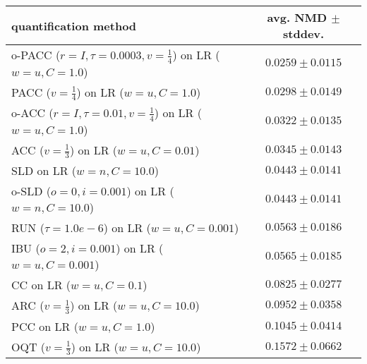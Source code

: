 \begin{tabular}{lc}
  \toprule
  quantification method & avg. NMD $\pm$ stddev. \\
  \midrule
  o-PACC ($r=I, \tau=0.0003, v=\frac{1}{4}$) on LR ($w=u, C=1.0$) & $\mathbf{0.0259 \pm 0.0115}$ \\
  PACC ($v=\frac{1}{4}$) on LR ($w=u, C=1.0$) & $0.0298 \pm 0.0149$ \\
  o-ACC ($r=I, \tau=0.01, v=\frac{1}{4}$) on LR ($w=u, C=1.0$) & $0.0322 \pm 0.0135$ \\
  ACC ($v=\frac{1}{3}$) on LR ($w=u, C=0.01$) & $0.0345 \pm 0.0143$ \\
  SLD on LR ($w=n, C=10.0$) & $0.0443 \pm 0.0141$ \\
  o-SLD ($o=0, i=0.001$) on LR ($w=n, C=10.0$) & $0.0443 \pm 0.0141$ \\
  RUN ($\tau=1.0e-6$) on LR ($w=u, C=0.001$) & $0.0563 \pm 0.0186$ \\
  IBU ($o=2, i=0.001$) on LR ($w=u, C=0.001$) & $0.0565 \pm 0.0185$ \\
  CC on LR ($w=u, C=0.1$) & $0.0825 \pm 0.0277$ \\
  ARC ($v=\frac{1}{3}$) on LR ($w=u, C=10.0$) & $0.0952 \pm 0.0358$ \\
  PCC on LR ($w=u, C=1.0$) & $0.1045 \pm 0.0414$ \\
  OQT ($v=\frac{1}{3}$) on LR ($w=u, C=10.0$) & $0.1572 \pm 0.0662$ \\
  \bottomrule
\end{tabular}
